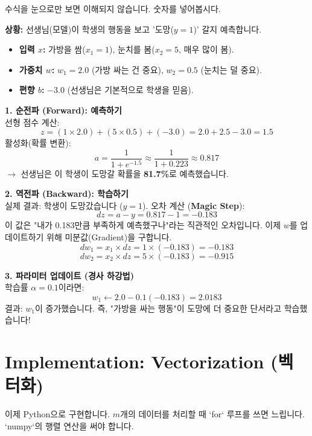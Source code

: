 \documentclass[11pt,a4paper]{book}
\theoremstyle{definition}
\begin{document}
수식을 눈으로만 보면 이해되지 않습니다. 숫자를 넣어봅시다.

\begin{examplebox}[title={야간 자율학습 도망자 잡기 시나리오}]
\textbf{상황:} 선생님(모델)이 학생의 행동을 보고 '도망($y=1$)' 갈지 예측합니다.
\begin{itemize}
    \item \textbf{입력 $x$:} 가방을 쌈($x_1=1$), 눈치를 봄($x_2=5$, 매우 많이 봄).
    \item \textbf{가중치 $w$:} $w_1=2.0$ (가방 싸는 건 중요), $w_2=0.5$ (눈치는 덜 중요).
    \item \textbf{편향 $b$:} $-3.0$ (선생님은 기본적으로 학생을 믿음).
\end{itemize}

\textbf{1. 순전파 (Forward): 예측하기} \\
선형 점수 계산:
$$ z = (1 \times 2.0) + (5 \times 0.5) + (-3.0) = 2.0 + 2.5 - 3.0 = 1.5 $$
활성화(확률 변환):
$$ a = \frac{1}{1 + e^{-1.5}} \approx \frac{1}{1 + 0.223} \approx 0.817 $$
$\rightarrow$ 선생님은 이 학생이 도망갈 확률을 \textbf{81.7\%}로 예측했습니다.

\textbf{2. 역전파 (Backward): 학습하기} \\
실제 결과: 학생이 도망갔습니다 ($y=1$).
오차 계산 (\textbf{Magic Step}):
$$ dz = a - y = 0.817 - 1 = -0.183 $$
이 값은 "내가 0.183만큼 부족하게 예측했구나"라는 직관적인 오차입니다.
이제 $w$를 업데이트하기 위해 미분값(Gradient)을 구합니다.
$$ dw_1 = x_1 \times dz = 1 \times (-0.183) = -0.183 $$
$$ dw_2 = x_2 \times dz = 5 \times (-0.183) = -0.915 $$

\textbf{3. 파라미터 업데이트 (경사 하강법)} \\
학습률 $\alpha = 0.1$이라면:
$$ w_1 \leftarrow 2.0 - 0.1(-0.183) = 2.0183 $$
결과: $w_1$이 증가했습니다. 즉, "가방을 싸는 행동"이 도망에 더 중요한 단서라고 학습했습니다!
\end{examplebox}

\section{Implementation: Vectorization (벡터화)}

이제 Python으로 구현합니다. $m$개의 데이터를 처리할 때 `for` 루프를 쓰면 느립니다. `numpy`의 행렬 연산을 써야 합니다.
\end{document}
